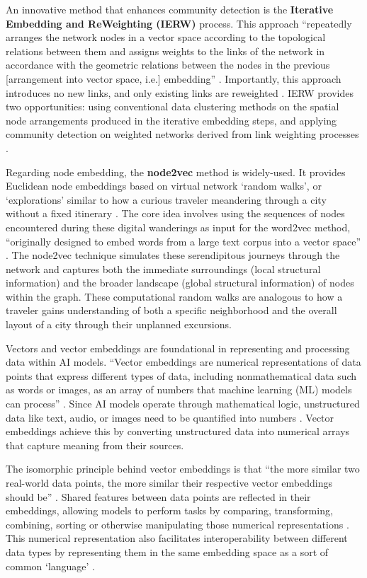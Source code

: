 An innovative method that enhances community detection is the \textbf{Iterative Embedding and ReWeighting (IERW)} process. This approach “repeatedly arranges the network nodes in a vector space according to the topological relations between them and assigns weights to the links of the network in accordance with the geometric relations between the nodes in the previous [arrangement into vector space, i.e.] embedding” \citep[p. 2]{kovacs_iterative_2024}. Importantly, this approach introduces no new links, and only existing links are reweighted \citep[p. 2]{kovacs_iterative_2024}. IERW provides two opportunities: using conventional data clustering methods on the spatial node arrangements produced in the iterative embedding steps, and applying community detection on weighted networks derived from link weighting processes \citep[p. 2]{kovacs_iterative_2024}.

Regarding node embedding, the \textbf{node2vec} method is widely-used. It provides Euclidean node embeddings based on virtual network ‘random walks’, or ‘explorations’ similar to how a curious traveler meandering through a city without a fixed itinerary \citep{kovacs_iterative_2024}. The core idea involves using the sequences of nodes encountered during these digital wanderings as input for the word2vec method, “originally designed to embed words from a large text corpus into a vector space” \citep{kovacs_iterative_2024}. The node2vec technique simulates these serendipitous journeys through the network and captures both the immediate surroundings (local structural information) and the broader landscape (global structural information) of nodes within the graph. These computational random walks are analogous to how a traveler gains understanding of both a specific neighborhood and the overall layout of a city through their unplanned excursions.

Vectors and vector embeddings are foundational in representing and processing data within AI models. “Vector embeddings are numerical representations of data points that express different types of data, including nonmathematical data such as words or images, as an array of numbers that machine learning (ML) models can process”  \citep{bergmann_what_2024}. Since AI models operate through mathematical logic, unstructured data like text, audio, or images need to be quantified into numbers \citep{bergmann_what_2024}. Vector embeddings achieve this by converting unstructured data into numerical arrays that capture meaning from their sources.

The isomorphic principle behind vector embeddings is that “the more similar two real-world data points, the more similar their respective vector embeddings should be” \citep{bergmann_what_2024}. Shared features between data points are reflected in their embeddings, allowing models to perform tasks by comparing, transforming, combining, sorting or otherwise manipulating those numerical representations \citep{bergmann_what_2024}. This numerical representation also facilitates interoperability between different data types by representing them in the same embedding space as a sort of common ‘language’ \citep{bergmann_what_2024}.

